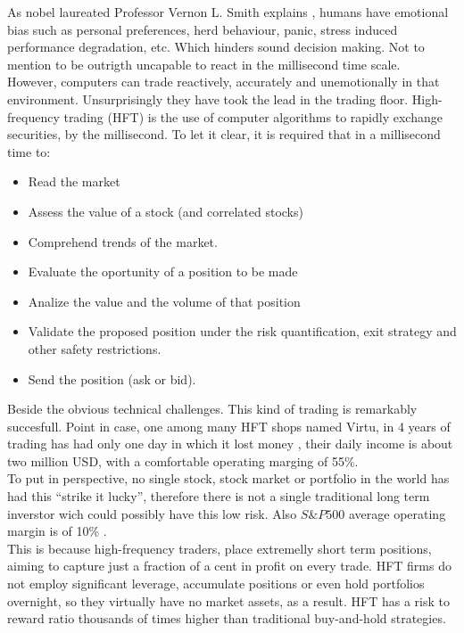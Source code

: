 \documentclass{tufte-book} %
\begin{document}
As nobel laureated Professor Vernon L. Smith explains \cite{smith2009}, humans have emotional bias such as personal preferences, herd behaviour, panic, stress induced performance degradation, etc. Which hinders sound decision making. Not to mention to be outrigth uncapable to react in the millisecond time scale.\\

However, computers can trade reactively, accurately and unemotionally in that environment. Unsurprisingly they have took the lead in the trading floor. High-frequency trading (HFT) is the use of computer algorithms to rapidly exchange securities, by the millisecond. To let it clear, it is required that in a millisecond time to:
\begin{itemize}
\item Read the market
\item Assess the value of a stock (and correlated stocks)
\item Comprehend trends of the market.
\item Evaluate the oportunity of a position to be made
\item Analize the value and the volume of that position
\item Validate the proposed position under the risk quantification, exit strategy and other safety restrictions.
\item Send the position (ask or bid).
\end{itemize}

Beside the obvious technical challenges. This kind of trading is remarkably succesfull. Point in case, one among many HFT shops named Virtu, in 4 years of trading has had only one day in which it lost money \cite{bworld}, their daily income is about two million USD, with a comfortable operating marging of 55\%.\\

To put in perspective, no single stock, stock market or portfolio in the world has had this ``strike it lucky'', therefore there is not a single traditional long term inverstor wich could possibly have this low risk. Also $S\&P 500$ average operating margin is of 10\% \cite{Yardeni2014}.\\

This is because high-frequency traders, place extremelly short term positions, aiming to capture just a fraction of a cent in profit on every trade. HFT firms do not employ significant leverage, accumulate positions or even hold portfolios overnight, so they virtually have no market assets, as a result. HFT has a risk to reward ratio thousands of times higher than traditional buy-and-hold strategies.
\end{document}
